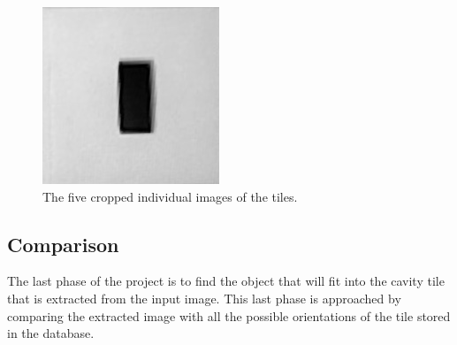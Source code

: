 \documentclass{article}
\begin{document}
\begin{figure}[h!]
\begin{minipage}{\textwidth}
\hspace{0.1cm}
\includegraphics[scale=0.3]{images/tile4.jpg}
\caption{The five cropped individual images of the tiles.}
\label{fig:individ}
\end{minipage}
\end{figure}

\subsection{Comparison}
The last phase of the project is to find the object that will fit into the cavity tile that is extracted from the input image. This last phase is approached by comparing the extracted image with all the possible orientations of the tile stored in the database.  
\end{document}
